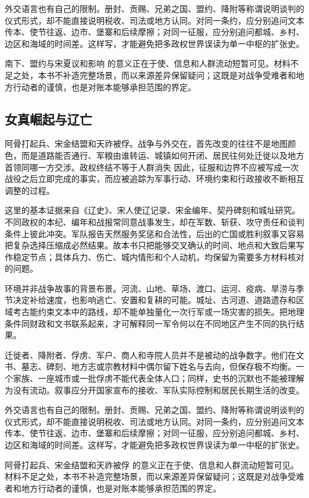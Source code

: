 外交语言也有自己的限制。册封、贡赐、兄弟之国、盟约、降附等称谓说明谈判的仪式形式，却不能直接说明税收、司法或地方认同。对同一条约，应分别追问文本传本、使节往返、边市、堡寨和后续摩擦；对同一征服，应分别追问都城、乡村、边区和海域的时间差。这样写，才能避免把多政权世界误读为单一中枢的扩张史。

南下、盟约与宋夏议和影响 的意义正在于使、信息和人群流动短暂可见。材料不足之处，本书不补造完整场景，而以来源差异保留疑问；这既是对战争受难者和地方行动者的谨慎，也是对账本能够承担范围的界定。

\subsection{女真崛起与辽亡}

阿骨打起兵、宋金结盟和天祚被俘。战争与外交在，首先改变的往往不是地图颜色，而是道路能否通行、军粮由谁转运、城镇如何开闭、居民往何处迁徙以及地方首领同哪一方交涉。政权终结不等于人群消失 因此，征服和边界不应被写成一次战役之后立即完成的事实，而应被追踪为军事行动、环境约束和行政接收不断相互调整的过程。

这里的基本证据来自《辽史》、宋人使辽记录、宋金编年、契丹碑刻和城址研究。不同政权的本纪、编年和战报常同意战事发生，却在军数、斩获、攻守责任和谈判条件上彼此冲突。军队报告天然服务奖惩和合法性，后出的亡国或胜利叙事又容易把复杂选择压缩成必然结果。故本书只把能够交叉确认的时间、地点和大致后果写作稳定节点；具体兵力、伤亡、城内情形和个人动机，均保留为需要多方材料核对的问题。

环境并非战争故事的背景布景。河流、山地、草场、渡口、运河、疫病、旱涝与季节决定补给速度，也影响逃亡、安置和复耕的可能。城址、古河道、道路遗存和区域考古能约束文本中的路线，却不能单独量化一次行军或一场灾害的损失。把地理条件同财政和文书联系起来，才可解释同一军令何以在不同地区产生不同的执行结果。

迁徙者、降附者、俘虏、军户、商人和寺院人员并不是被动的战争数字。他们在文书、墓志、碑刻、地方志或宗教材料中偶尔留下姓名与去向，但保存极不均衡。一个家族、一座城市或一批俘虏不能代表全体人口；同样，史书的沉默也不能被理解为没有流动。叙事应分开国家宣布的接收、军队实际控制和居民长期生活的改变。

外交语言也有自己的限制。册封、贡赐、兄弟之国、盟约、降附等称谓说明谈判的仪式形式，却不能直接说明税收、司法或地方认同。对同一条约，应分别追问文本传本、使节往返、边市、堡寨和后续摩擦；对同一征服，应分别追问都城、乡村、边区和海域的时间差。这样写，才能避免把多政权世界误读为单一中枢的扩张史。

阿骨打起兵、宋金结盟和天祚被俘 的意义正在于使、信息和人群流动短暂可见。材料不足之处，本书不补造完整场景，而以来源差异保留疑问；这既是对战争受难者和地方行动者的谨慎，也是对账本能够承担范围的界定。

